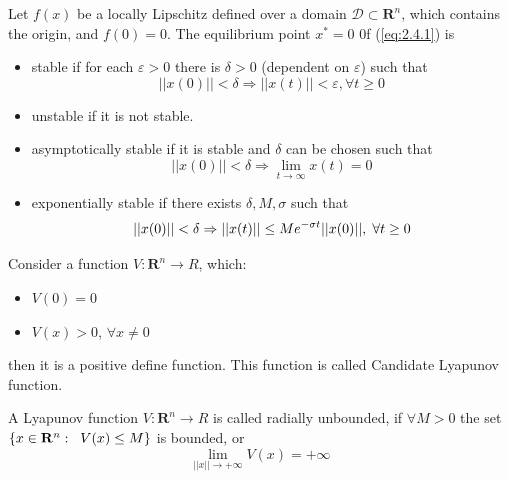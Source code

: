     \begin{definition}\label{def:2.29}
        \cite{HK2001} Let $f(x)$ be a locally Lipschitz defined over a domain $\mathcal{D} \subset \mathbf{R}^n$, which contains the origin, and $f(0) = 0$. The equilibrium point $x^* = 0$ 0f (\ref{eq:2.4.1}) is
        \begin{itemize}
            \item stable if for each $\varepsilon > 0$ there is $\delta > 0$ (dependent on $\varepsilon$) such that
                \begin{equation*}
                    ||x(0)|| < \delta \Rightarrow  ||x(t)|| < \varepsilon, \forall t \geq 0
                \end{equation*}
            \item unstable if it is not stable.
            \item asymptotically stable if it is stable and $\delta$ can be chosen such that
                \begin{equation*}
                    ||x(0)|| < \delta \Rightarrow \lim_{t \to \infty} x(t) = 0
                \end{equation*}
            \item exponentially stable if there exists $\delta, M, \sigma$ such that
            \begin{equation*}
                ||x(0)|| < \delta \Rightarrow ||x(t)|| \leq Me^{-\sigma t}||x(0)||, \hspace{1.0mm} \forall t \geq 0
            \end{equation*}
        \end{itemize}
    \end{definition}
    

    \begin{definition}\label{def:2.30}
        \cite{HK2001} Consider a function $V: \mathbf{R}^n \to R$, which:
        \begin{itemize}
            \item $V(0) = 0$
            \item $V(x) > 0$, $\forall x \neq 0$
        \end{itemize}
        then it is a positive define function. This function is called Candidate Lyapunov function.
    \end{definition}

    \begin{definition}\label{def:2.31}
        \cite{HK2001} A Lyapunov function $V: \mathbf{R}^n \to R$ is called radially unbounded, if $\forall M > 0$ the set $\{x\in\mathbf{R}^n: \hspace{2.0mm} V(x) \leq M\}$ is bounded, or
        \begin{equation*}
            \lim_{||x|| \to +\infty} V(x) = +\infty
        \end{equation*}
    \end{definition}

